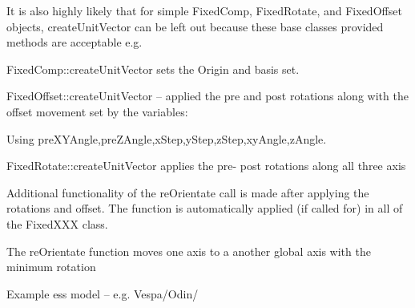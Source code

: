It is also highly likely that for simple FixedComp, FixedRotate, and
FixedOffset objects, createUnitVector can be left out because these
base classes provided methods are acceptable e.g.

FixedComp::createUnitVector sets the Origin and basis set.

FixedOffset::createUnitVector -- applied the pre and post rotations
along with the offset movement set by the variables:

Using preXYAngle,preZAngle,xStep,yStep,zStep,xyAngle,zAngle.

FixedRotate::createUnitVector applies the pre- post rotations along
all three axis


Additional functionality of the reOrientate call is made after
applying the rotations and offset. The function is automatically
applied (if called for) in all of the FixedXXX class.

The reOrientate function moves one axis to a another global axis with
the minimum rotation

Example ess model -- e.g. Vespa/Odin/
